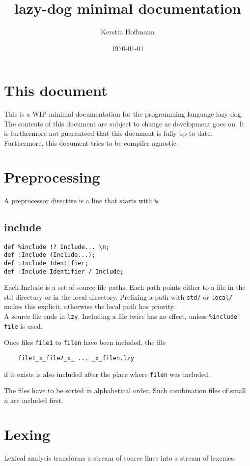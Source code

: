 \documentclass{article}
\title{lazy-dog minimal documentation}
\author{Kerstin Hoffmann}
\date{\today}
\begin{document}
\maketitle
\tableofcontents
\section{This document}
This is a WIP minimal documentation for
the programming language lazy-dog.
The contents of this document are subject to change
as development goes on.
It is furthermore not guaranteed that this document 
is fully up to date.\\

Furthermore, this document tries to be compiler agnostic.

\section{Preprocessing}
A preprocessor directive
is a line that starts with \verb.%..
\subsection{include}
\begin{verbatim}
def %include !? Include... \n;
def :Include (Include...);
def :Include Identifier;
def :Include Identifier / Include;
\end{verbatim}
Each Include is a set of source file paths.
Each path points either to a file in the std directory
or in the local directory.
Prefixing a path with \verb.std/. or \verb.local/.
makes this explicit, otherwise the local path
has priority.\\

A source file ends in \verb.lzy.. 
Including a file twice has no effect,
unless \verb.%include! file. is used.

Once files \verb.file1. to \verb.filen. have been
included, the file
\begin{verbatim}
    file1_x_file2_x_ ... _x_filen.lzy
\end{verbatim}
if it exists
is also included after the place where
\verb.filen. was included.

The files have to be sorted in alphabetical order.
Such combination files of small $n$ are included first.

\section{Lexing}
Lexical analysis transforms a stream of source
lines into a stream of lexemes.\\
\end{document}
